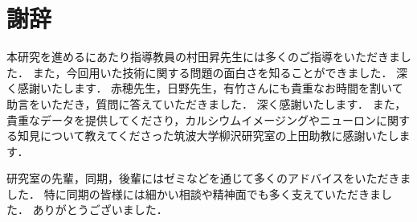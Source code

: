 \chapter*{謝辞}
本研究を進めるにあたり指導教員の村田昇先生には多くのご指導をいただきました．
また，今回用いた技術に関する問題の面白さを知ることができました．
深く感謝いたします．
赤穂先生，日野先生，有竹さんにも貴重なお時間を割いて助言をいただき，質問に答えていただきました．
深く感謝いたします．
また，貴重なデータを提供してくださり，カルシウムイメージングやニューロンに関する知見について教えてくださった筑波大学柳沢研究室の上田助教に感謝いたします．

研究室の先輩，同期，後輩にはゼミなどを通じて多くのアドバイスをいただきました．
特に同期の皆様には細かい相談や精神面でも多く支えていただきました．
ありがとうございました．

